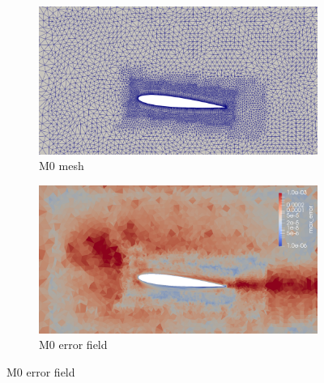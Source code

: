 \begin{figure}[H]
\centering

\begin{subfigure}[b]{0.475\textwidth}
\centering
\includegraphics[width=1\textwidth]{figures/zonal_adapt_results/Mesh_and_error_plots/M0_inplane.png}
\caption{M0 mesh}
\label{fig:zonal_M0_mesh}
\end{subfigure}
\begin{subfigure}[b]{0.475\textwidth}
\centering
\includegraphics[width=1\textwidth]{figures/zonal_adapt_results/Mesh_and_error_plots/M0_error.png}
\caption{M0 error field}
\label{fig:zonal_M0_error}
\end{subfigure}


\end{figure}
